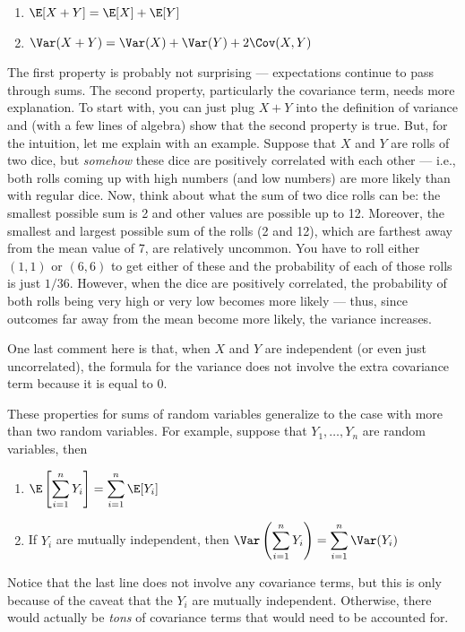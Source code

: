 \documentclass[
  letterpaper,
  DIV=11,
  numbers=noendperiod]{scrreprt}
\begin{document}
\begin{enumerate}
\def\labelenumi{\arabic{enumi}.}
\item
  \(\E[X+Y] = \E[X] + \E[Y]\)
\item
  \(\Var(X+Y) = \Var(X) + \Var(Y) + 2\Cov(X,Y)\)
\end{enumerate}

The first property is probably not surprising --- expectations continue
to pass through sums. The second property, particularly the covariance
term, needs more explanation. To start with, you can just plug \(X+Y\)
into the definition of variance and (with a few lines of algebra) show
that the second property is true. But, for the intuition, let me explain
with an example. Suppose that \(X\) and \(Y\) are rolls of two dice, but
\emph{somehow} these dice are positively correlated with each other ---
i.e., both rolls coming up with high numbers (and low numbers) are more
likely than with regular dice. Now, think about what the sum of two dice
rolls can be: the smallest possible sum is 2 and other values are
possible up to 12. Moreover, the smallest and largest possible sum of
the rolls (2 and 12), which are farthest away from the mean value of 7,
are relatively uncommon. You have to roll either \((1,1)\) or \((6,6)\)
to get either of these and the probability of each of those rolls is
just \(1/36\). However, when the dice are positively correlated, the
probability of both rolls being very high or very low becomes more
likely --- thus, since outcomes far away from the mean become more
likely, the variance increases.

One last comment here is that, when \(X\) and \(Y\) are independent (or
even just uncorrelated), the formula for the variance does not involve
the extra covariance term because it is equal to 0.

These properties for sums of random variables generalize to the case
with more than two random variables. For example, suppose that
\(Y_1, \ldots, Y_n\) are random variables, then

\begin{enumerate}
\def\labelenumi{\arabic{enumi}.}
\item
  \(\E\left[ \displaystyle \sum_{i=1}^n Y_i \right] = \displaystyle \sum_{i=1}^n \E[Y_i]\)
\item
  If \(Y_i\) are mutually independent, then
  \(\Var\left( \displaystyle \sum_{i=1}^n Y_i \right) = \displaystyle \sum_{i=1}^n \Var(Y_i)\)
\end{enumerate}

Notice that the last line does not involve any covariance terms, but
this is only because of the caveat that the \(Y_i\) are mutually
independent. Otherwise, there would actually be \emph{tons} of
covariance terms that would need to be accounted for.
\end{document}
